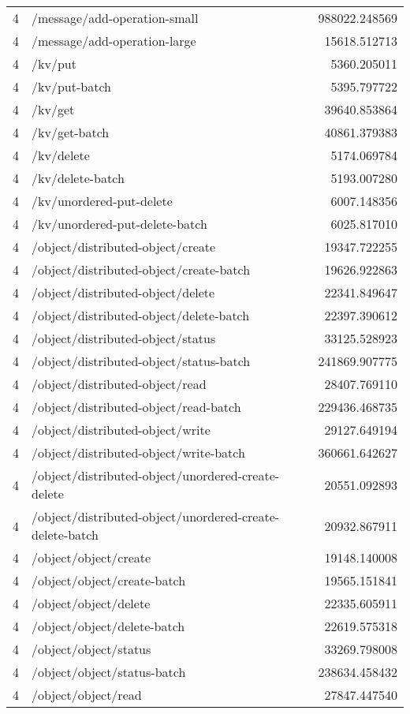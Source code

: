 \begin{longtable}{rlr}
4 & /message/add-operation-small & 988022.248569 \\
4 & /message/add-operation-large & 15618.512713 \\
4 & /kv/put & 5360.205011 \\
4 & /kv/put-batch & 5395.797722 \\
4 & /kv/get & 39640.853864 \\
4 & /kv/get-batch & 40861.379383 \\
4 & /kv/delete & 5174.069784 \\
4 & /kv/delete-batch & 5193.007280 \\
4 & /kv/unordered-put-delete & 6007.148356 \\
4 & /kv/unordered-put-delete-batch & 6025.817010 \\
4 & /object/distributed-object/create & 19347.722255 \\
4 & /object/distributed-object/create-batch & 19626.922863 \\
4 & /object/distributed-object/delete & 22341.849647 \\
4 & /object/distributed-object/delete-batch & 22397.390612 \\
4 & /object/distributed-object/status & 33125.528923 \\
4 & /object/distributed-object/status-batch & 241869.907775 \\
4 & /object/distributed-object/read & 28407.769110 \\
4 & /object/distributed-object/read-batch & 229436.468735 \\
4 & /object/distributed-object/write & 29127.649194 \\
4 & /object/distributed-object/write-batch & 360661.642627 \\
4 & /object/distributed-object/unordered-create-delete & 20551.092893 \\
4 & /object/distributed-object/unordered-create-delete-batch & 20932.867911 \\
4 & /object/object/create & 19148.140008 \\
4 & /object/object/create-batch & 19565.151841 \\
4 & /object/object/delete & 22335.605911 \\
4 & /object/object/delete-batch & 22619.575318 \\
4 & /object/object/status & 33269.798008 \\
4 & /object/object/status-batch & 238634.458432 \\
4 & /object/object/read & 27847.447540 \\

\end{longtable}
